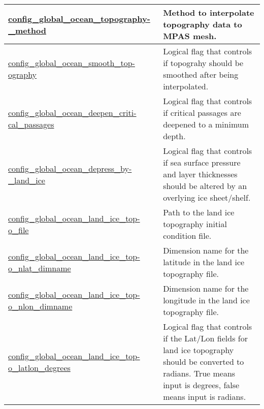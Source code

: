 {\begin{center}
\begin{longtable}{| p{2.0in} || p{4.0in} |}
    \hline
    \hyperref[subsec:nm_sec_config_global_ocean_topography_method]{config\_global\_ocean\_topography-}\hyperref[subsec:nm_sec_config_global_ocean_topography_method]{\_method}& Method to interpolate topography data to MPAS mesh. \\
    \hline
    \hyperref[subsec:nm_sec_config_global_ocean_smooth_topography]{config\_global\_ocean\_smooth\_top-}\hyperref[subsec:nm_sec_config_global_ocean_smooth_topography]{ography}& Logical flag that controls if topograhy should be smoothed after being interpolated. \\
    \hline
    \hyperref[subsec:nm_sec_config_global_ocean_deepen_critical_passages]{config\_global\_ocean\_deepen\_criti-}\hyperref[subsec:nm_sec_config_global_ocean_deepen_critical_passages]{cal\_passages}& Logical flag that controls if critical passages are deepened to a minimum depth. \\
    \hline
    \hyperref[subsec:nm_sec_config_global_ocean_depress_by_land_ice]{config\_global\_ocean\_depress\_by-}\hyperref[subsec:nm_sec_config_global_ocean_depress_by_land_ice]{\_land\_ice}& Logical flag that controls if sea surface pressure and layer thicknesses should be altered by an overlying ice sheet/shelf. \\
    \hline
    \hyperref[subsec:nm_sec_config_global_ocean_land_ice_topo_file]{config\_global\_ocean\_land\_ice\_top-}\hyperref[subsec:nm_sec_config_global_ocean_land_ice_topo_file]{o\_file}& Path to the land ice topography initial condition file. \\
    \hline
    \hyperref[subsec:nm_sec_config_global_ocean_land_ice_topo_nlat_dimname]{config\_global\_ocean\_land\_ice\_top-}\hyperref[subsec:nm_sec_config_global_ocean_land_ice_topo_nlat_dimname]{o\_nlat\_dimname}& Dimension name for the latitude in the land ice topography file. \\
    \hline
    \hyperref[subsec:nm_sec_config_global_ocean_land_ice_topo_nlon_dimname]{config\_global\_ocean\_land\_ice\_top-}\hyperref[subsec:nm_sec_config_global_ocean_land_ice_topo_nlon_dimname]{o\_nlon\_dimname}& Dimension name for the longitude in the land ice topography file. \\
    \hline
    \hyperref[subsec:nm_sec_config_global_ocean_land_ice_topo_latlon_degrees]{config\_global\_ocean\_land\_ice\_top-}\hyperref[subsec:nm_sec_config_global_ocean_land_ice_topo_latlon_degrees]{o\_latlon\_degrees}& Logical flag that controls if the Lat/Lon fields for land ice topography should be converted to radians. True means input is degrees, false means input is radians. \\

\end{longtable}
\end{center}}
